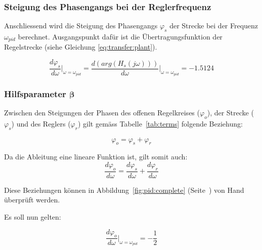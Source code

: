 \subsubsection{Steigung des Phasengangs bei der Reglerfrequenz}

Anschliessend   wird   die   Steigung    des   Phasengangs   $\varphi_s$   der
Strecke  bei  der  Frequenz  $\omega_{pid}$  berechnet. Ausgangspunkt  daf\"ur
ist   die    \"Ubertragungsfunktion   der   Regelstrecke    (siehe   Gleichung
\ref{eq:transfer:plant}).

\begin{equation} \label{eq:transfer:plant:derivative}
    \frac{d\varphi_s}{d\omega} \biggr \rvert_{\omega=\omega_{pid}}
        = \frac{d(arg(H_s(j\omega)))}{d\omega} \biggr \rvert_{\omega=\omega_{pid}}
        = -1.5124
\end{equation}


\subsubsection{Hilfsparameter $\boldsymbol{\beta}$}

Zwischen  den Steigungen  der Phasen  des offenen  Regelkreises ($\varphi_o$),
der  Strecke  ($\varphi_s$)  und   des  Reglers  ($\varphi_r$)  gilt  gem\"ass
Tabelle~\ref{tab:terms} folgende Beziehung:

\begin{equation} \label{eq:pid:phi_sum}
    \varphi_o = \varphi_s + \varphi_r
\end{equation}

Da die Ableitung eine lineare Funktion ist, gilt somit auch:
\begin{equation} \label{eq:pid:dphi_sum}
    \frac{d\varphi_o}{d\omega} = \frac{d\varphi_s}{d\omega} + \frac{d\varphi_r}{d\omega}
\end{equation}

Diese     Beziehungen     k\"onnen     in     Abbildung~\ref{fig:pid:complete}
(Seite~\pageref{fig:pid:complete}) von Hand \"uberpr\"uft werden.

Es soll nun gelten:

\begin{equation} \label{eq:pid:dphi_o_target}
    \frac{d\varphi_o}{d\omega} \biggr \rvert_{\omega=\omega_{pid}} = - \frac{1}{2}
\end{equation}

